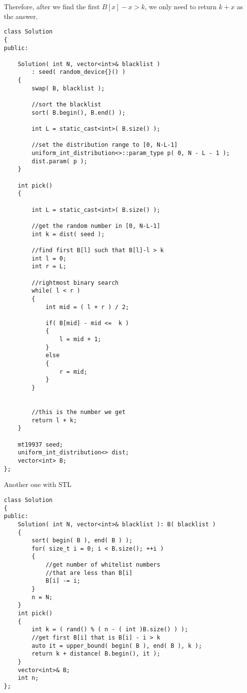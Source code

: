 Therefore, after we find the first $B[x]-x > k$, we only need to return $k+x$ as the answer.

\setcounter{lstlisting}{0}
\begin{lstlisting}[style=customc, caption={Binary Search}]
class Solution
{
public:

    Solution( int N, vector<int>& blacklist )
        : seed( random_device{}() )
    {
        swap( B, blacklist );

        //sort the blacklist
        sort( B.begin(), B.end() );

        int L = static_cast<int>( B.size() );

        //set the distribution range to [0, N-L-1]
        uniform_int_distribution<>::param_type p( 0, N - L - 1 );
        dist.param( p );
    }

    int pick()
    {

        int L = static_cast<int>( B.size() );

        //get the random number in [0, N-L-1]
        int k = dist( seed );

        //find first B[l] such that B[l]-l > k
        int l = 0;
        int r = L;

        //rightmost binary search
        while( l < r )
        {
            int mid = ( l + r ) / 2;

            if( B[mid] - mid <=  k )
            {
                l = mid + 1;
            }
            else
            {
                r = mid;
            }
        }


        //this is the number we get
        return l + k;
    }

    mt19937 seed;
    uniform_int_distribution<> dist;
    vector<int> B;
};
\end{lstlisting}

Another one with STL

\begin{lstlisting}[style=customc, caption={STL}]
class Solution
{
public:
    Solution( int N, vector<int>& blacklist ): B( blacklist )
    {
        sort( begin( B ), end( B ) );
        for( size_t i = 0; i < B.size(); ++i )
        {
            //get number of whitelist numbers
            //that are less than B[i]
            B[i] -= i;
        }
        n = N;
    }
    int pick()
    {
        int k = ( rand() % ( n - ( int )B.size() ) );
        //get first B[i] that is B[i] - i > k
        auto it = upper_bound( begin( B ), end( B ), k );
        return k + distance( B.begin(), it );
    }
    vector<int>& B;
    int n;
};
\end{lstlisting}

